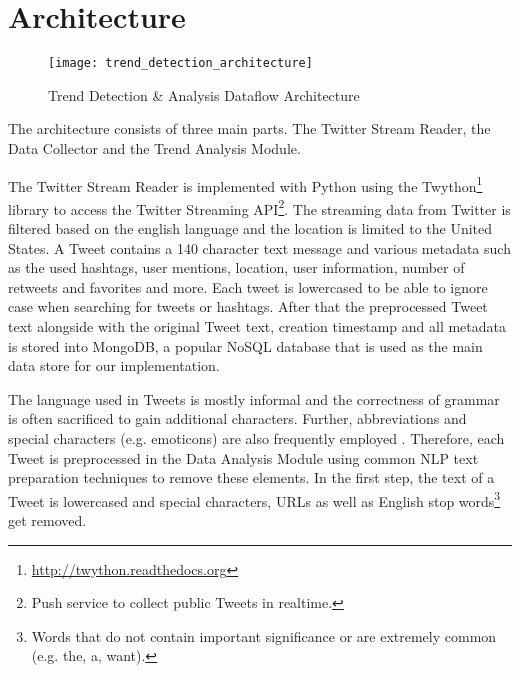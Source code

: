 \section{Architecture}
\label{sec:architecture}

\begin{figure}[H]
  \centering
        \texttt{[image: trend\_detection\_architecture]}
  \caption[Trend Detection \& Analysis Dataflow Architecture]{Trend Detection \& Analysis Dataflow Architecture}
  \label{fig:christmas-new-year-time-series}
  \vspace{-1.3em}
\end{figure}


The architecture consists of three main parts. The Twitter Stream Reader, the Data Collector and the Trend Analysis Module.

The Twitter Stream Reader is implemented with Python using the Twython\footnote{\url{http://twython.readthedocs.org} \accessednote} library to access the Twitter Streaming API\footnote{Push service to collect public Tweets in realtime.}. The streaming data from Twitter is filtered based on the english language and the location is limited to the United States. A Tweet contains a 140 character text message and various metadata such as the used hashtags, user mentions, location, user information, number of retweets and favorites and more. Each tweet is lowercased to be able to ignore case when searching for tweets or hashtags. After that the preprocessed Tweet text alongside with the original Tweet text, creation timestamp and all metadata is stored into MongoDB, a popular NoSQL database that is used as the main data store for our implementation.

The language used in Tweets is mostly informal and the correctness of grammar is often sacrificed to gain additional characters. Further, abbreviations and special characters (e.g. emoticons) are also frequently employed \cite[67]{TwitterDataAnalytics2013}. Therefore, each Tweet is preprocessed in the Data Analysis Module using common NLP text preparation techniques to remove these elements. In the first step, the text of a Tweet is lowercased and special characters, URLs as well as English stop words\footnote{Words that do not contain important significance or are extremely common (e.g. the, a, want).} get removed.


